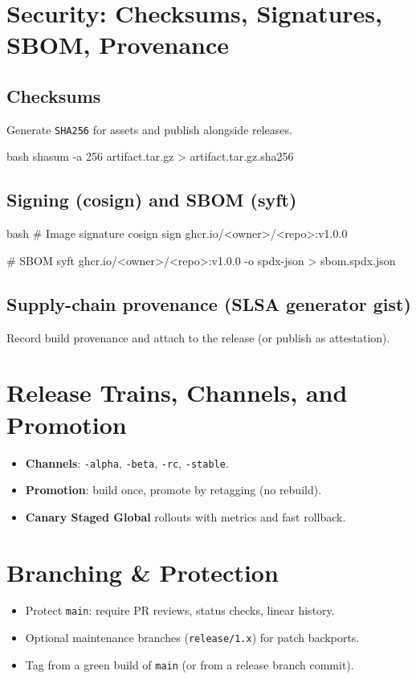 \documentclass[11pt]{article}
\begin{document}
\section{Security: Checksums, Signatures, SBOM, Provenance}
\subsection{Checksums}
Generate \texttt{SHA256} for assets and publish alongside releases.
\begin{code}{bash}
shasum -a 256 artifact.tar.gz > artifact.tar.gz.sha256
\end{code}

\subsection{Signing (cosign) and SBOM (syft)}
\begin{code}{bash}
# Image signature
cosign sign ghcr.io/<owner>/<repo>:v1.0.0

# SBOM
syft ghcr.io/<owner>/<repo>:v1.0.0 -o spdx-json > sbom.spdx.json
\end{code}

\subsection{Supply-chain provenance (SLSA generator gist)}
Record build provenance and attach to the release (or publish as attestation).

\section{Release Trains, Channels, and Promotion}
\begin{itemize}
  \item \textbf{Channels}: \texttt{-alpha}, \texttt{-beta}, \texttt{-rc}, \texttt{-stable}.
  \item \textbf{Promotion}: build once, promote by retagging (no rebuild).
  \item \textbf{Canary \textrightarrow{} Staged \textrightarrow{} Global} rollouts with metrics and fast rollback.
\end{itemize}

\section{Branching \& Protection}
\begin{itemize}
  \item Protect \texttt{main}: require PR reviews, status checks, linear history.
  \item Optional maintenance branches (\texttt{release/1.x}) for patch backports.
  \item Tag from a green build of \texttt{main} (or from a release branch commit).
\end{itemize}
\end{document}
